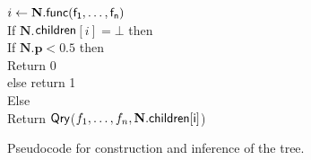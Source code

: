 \begin{figure}[h]
{		
		$i\gets\textbf{N}.\sf{func}({f_1,\dots,f_n})$\\
		If $\textbf{N}.$$\sf{children}$$[i]=\bot$ then\\
		\ind If $\textbf{N}.\textbf{p} < 0.5$ then \\
		\ind \ind Return 0\\
		\ind else return 1\\
		Else \\
		\ind Return $\sf{Qry}$(${f_1,\dots,f_n},\mathnormal{\textbf{N}.\sf{children}[i]}$)\\
	}
	\vspace{-.5cm}
	\caption{Pseudocode for construction and inference of the tree.}
	\label{fig:pseudocode}
	\vspace{-.5cm}
\end{figure}
